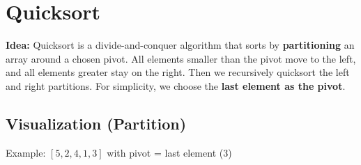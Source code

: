 \section{Quicksort}

\textbf{Idea:} Quicksort is a divide-and-conquer algorithm that sorts by
\textbf{partitioning} an array around a chosen pivot.
All elements smaller than the pivot move to the left,
and all elements greater stay on the right.
Then we recursively quicksort the left and right partitions. For simplicity, we choose the \textbf{last element as the pivot}.

\subsection{Visualization (Partition)}
Example: \([5,2,4,1,3]\) with pivot = last element (3)

